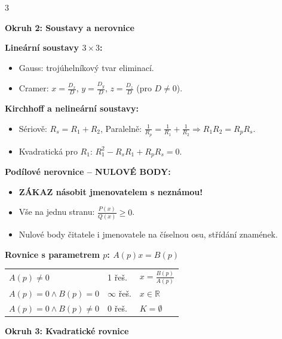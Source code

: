 \documentclass[9pt,a4paper]{article}
\begin{document}
\begin{tcolorbox}[secbox,title=OKRUHY 1--3: ALGEBRAICKÉ VÝRAZY, SOUSTAVY ROVNIC A KVADRATICKÉ ROVNICE]
\begin{multicols}{3}
\columnbreak

\textbf{\large Okruh 2: Soustavy a nerovnice}
\vspace{1mm}

\textbf{Lineární soustavy $3 \times 3$:}
\begin{itemize}
  \item Gauss: trojúhelníkový tvar eliminací.
  \item Cramer: $x = \frac{D_x}{D}$, $y = \frac{D_y}{D}$, $z = \frac{D_z}{D}$ (pro $D \neq 0$).
\end{itemize}
\textbf{Kirchhoff a nelineární soustavy:}
\begin{itemize}
  \item Sériově: $R_s = R_1 + R_2$, Paralelně: $\frac{1}{R_p} = \frac{1}{R_1} + \frac{1}{R_2} \Rightarrow R_1 R_2 = R_p R_s$.
  \item Kvadratická pro $R_1$: $R_1^2 - R_s R_1 + R_p R_s = 0$.
\end{itemize}
\textbf{Podílové nerovnice -- NULOVÉ BODY:}
\begin{itemize}
  \item \textbf{ZÁKAZ násobit jmenovatelem s neznámou!}
  \item Vše na jednu stranu: $\frac{P(x)}{Q(x)} \ge 0$.
  \item Nulové body čitatele i jmenovatele na číselnou osu, střídání znamének.
\end{itemize}
\textbf{Rovnice s parametrem $p$: $A(p)x = B(p)$}
\begin{center}
\renewcommand{\arraystretch}{1.05}
\setlength{\tabcolsep}{3pt}
{\footnotesize
\begin{tabular}{lll}
\toprule
$A(p) \neq 0$ & 1 řeš. & $x = \frac{B(p)}{A(p)}$ \\
$A(p) = 0 \land B(p) = 0$ & $\infty$ řeš. & $x \in \mathbb{R}$ \\
$A(p) = 0 \land B(p) \neq 0$ & 0 řeš. & $K = \emptyset$ \\
\bottomrule
\end{tabular}}
\end{center}

\columnbreak

\textbf{\large Okruh 3: Kvadratické rovnice}
\vspace{1mm}


\end{multicols}
\end{tcolorbox}
\end{document}
